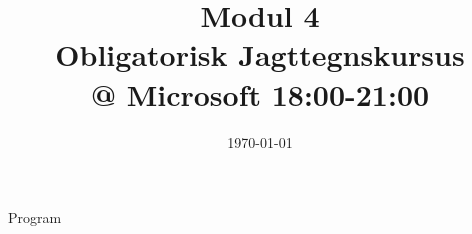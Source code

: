 \documentclass[11pt,aspectratio=169]{beamer}
\title{Modul 4 \\
Obligatorisk Jagttegnskursus \\ @ Microsoft 18:00-21:00}
\date{\today}
\begin{document}
\begin{frame}
  \titlepage
\end{frame}

\begin{frame}{Program}
  \tableofcontents
\end{frame}












\end{document}
